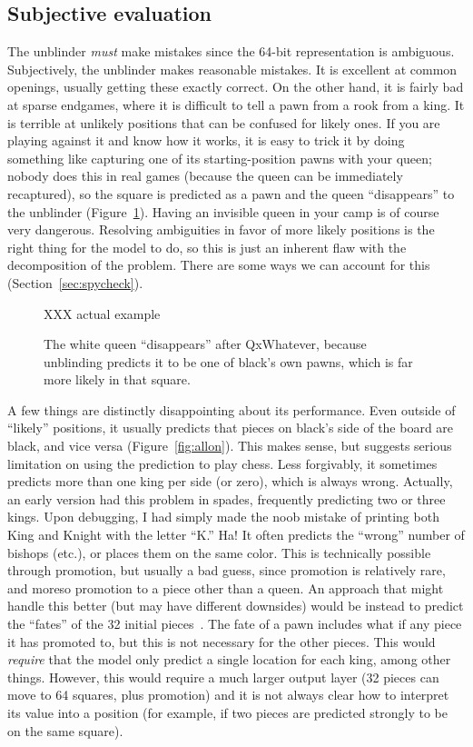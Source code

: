 \documentclass[twocolumn]{amsart}
\begin{document}
\subsection{Subjective evaluation}

The unblinder {\em must} make mistakes since the 64-bit representation
is ambiguous. Subjectively, the unblinder makes reasonable mistakes.
It is excellent at common openings, usually getting these exactly
correct. On the other hand, it is fairly bad at sparse endgames, where
it is difficult to tell a pawn from a rook from a king. It is terrible
at unlikely positions that can be confused for likely ones. If you are
playing against it and know how it works, it is easy to trick it by
doing something like capturing one of its starting-position pawns with
your queen; nobody does this in real games (because the queen can be
immediately recaptured), so the square is predicted as a pawn and the
queen ``disappears'' to the unblinder (Figure~\ref{fig:trick}). Having
an invisible queen in your camp is of course very dangerous. Resolving
ambiguities in favor of more likely positions is the right thing for
the model to do, so this is just an inherent flaw with the
decomposition of the problem. There are some ways we can account for
this (Section~\ref{sec:spycheck}).

\begin{figure}[ht]
XXX actual example
\caption{The white queen ``disappears'' after QxWhatever, because
  unblinding predicts it to be one of black's own pawns, which is far
  more likely in that square.} \label{fig:trick}
\end{figure}

A few things are distinctly disappointing about its performance. Even
outside of ``likely'' positions, it usually predicts that pieces on
black's side of the board are black, and vice versa
(Figure~\ref{fig:allon}). This makes sense, but suggests serious
limitation on using the prediction to play chess. Less forgivably, it
sometimes predicts more than one king per side (or zero), which is
always wrong. Actually, an early version had this problem in spades,
frequently predicting two or three kings. Upon debugging, I had simply
made the noob mistake of printing both King and Knight with the letter
``K.'' Ha! It often predicts the ``wrong'' number of bishops (etc.),
or places them on the same color. This is technically possible through
promotion, but usually a bad guess, since promotion is relatively
rare, and moreso promotion to a piece other than a queen. An approach
that might handle this better (but may have different downsides) would
be instead to predict the ``fates'' of the 32 initial
pieces~\cite{survival}. The fate of a pawn includes what if any piece
it has promoted to, but this is not necessary for the other pieces.
This would {\em require} that the model only predict a single location
for each king, among other things. However, this would require a much
larger output layer (32 pieces can move to 64 squares, plus promotion)
and it is not always clear how to interpret its value into a position
(for example, if two pieces are predicted strongly to be on the same
square).
\end{document}
